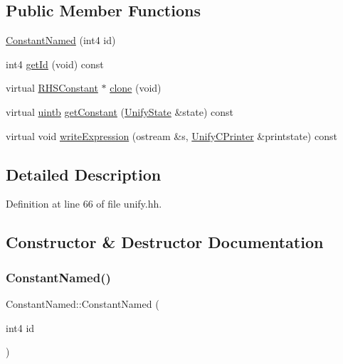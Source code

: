 \subsection*{Public Member Functions}
\begin{DoxyCompactItemize}
\item 
\mbox{\hyperlink{class_constant_named_a2fcb49b791d7e1e877cfc3d914fdab02}{Constant\+Named}} (int4 id)
\item 
int4 \mbox{\hyperlink{class_constant_named_aa8ac030fb4ea24762701635214de0c66}{get\+Id}} (void) const
\item 
virtual \mbox{\hyperlink{class_r_h_s_constant}{R\+H\+S\+Constant}} $\ast$ \mbox{\hyperlink{class_constant_named_af2013741889b5f76eb87f77651783e28}{clone}} (void)
\item 
virtual \mbox{\hyperlink{types_8h_a2db313c5d32a12b01d26ac9b3bca178f}{uintb}} \mbox{\hyperlink{class_constant_named_a714b8dea21d1d728beb39909a7e40324}{get\+Constant}} (\mbox{\hyperlink{class_unify_state}{Unify\+State}} \&state) const
\item 
virtual void \mbox{\hyperlink{class_constant_named_afb9ee047f745a300c7bfa84735857211}{write\+Expression}} (ostream \&s, \mbox{\hyperlink{class_unify_c_printer}{Unify\+C\+Printer}} \&printstate) const
\end{DoxyCompactItemize}


\subsection{Detailed Description}


Definition at line 66 of file unify.\+hh.



\subsection{Constructor \& Destructor Documentation}
\mbox{\label{class_constant_named_a2fcb49b791d7e1e877cfc3d914fdab02}} 
\subsubsection{\texorpdfstring{ConstantNamed()}{ConstantNamed()}}
{\footnotesize\ttfamily Constant\+Named\+::\+Constant\+Named (\begin{DoxyParamCaption}\item[{int4}]{id }\end{DoxyParamCaption})\hspace{0.3cm}{\ttfamily [inline]}}



